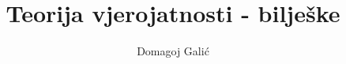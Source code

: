 \documentclass[a4paper,twoside,12pt]{report}
\begin{document}
    \title{Teorija vjerojatnosti - bilje\v ske}
    \author{Domagoj Gali\' c}



    
\end{document}
